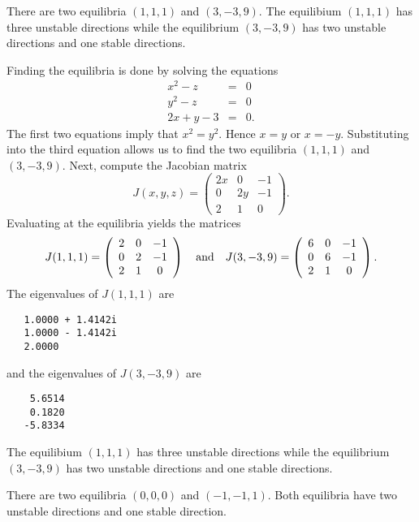  \ans There are two equilibria $(1,1,1)$ and $(3,-3,9)$.
The equilibium $(1,1,1)$ has three unstable directions while the
equilibrium $(3,-3,9)$ has two unstable directions and one stable directions.

\soln  Finding the equilibria is done by solving the equations
\begin{eqnarray*}
x^2-z & = & 0 \\
y^2-z & = & 0 \\
2x+y-3 & = & 0.
\end{eqnarray*}
The first two equations imply that $x^2=y^2$.  Hence $x=y$ or $x=-y$. 
Substituting into the third equation allows us to find the two equilibria
$(1,1,1)$ and $(3,-3,9)$.  Next, compute the Jacobian matrix
\[
J(x,y,z) = \left(\begin{array}{ccc}
2x & 0 & -1\\ 0 & 2y & -1\\ 2 & 1 & 0 \end{array}\right).
\]
Evaluating at the equilibria yields the matrices
\[
J(1,1,1) = \left(\begin{array}{ccc}
2 & 0 & -1\\ 0 & 2 & -1\\ 2 & 1 & 0 \end{array}\right)
\quad\mbox{and}\quad 
J(3,-3,9) = \left(\begin{array}{ccc}
6 & 0 & -1\\ 0 & 6 & -1\\ 2 & 1 & 0 \end{array}\right).
\]
The eigenvalues of $J(1,1,1)$ are
\begin{verbatim}
   1.0000 + 1.4142i
   1.0000 - 1.4142i
   2.0000     
\end{verbatim}
and the eigenvalues of $J(3,-3,9)$ are
\begin{verbatim}
    5.6514
    0.1820
   -5.8334
\end{verbatim}
The equilibium $(1,1,1)$ has three unstable directions while the
equilibrium $(3,-3,9)$ has two unstable directions and one stable 
directions.




  \ans There are two equilibria $(0,0,0)$ and $(-1,-1,1)$.
Both equilibria have two unstable directions and one stable direction.

